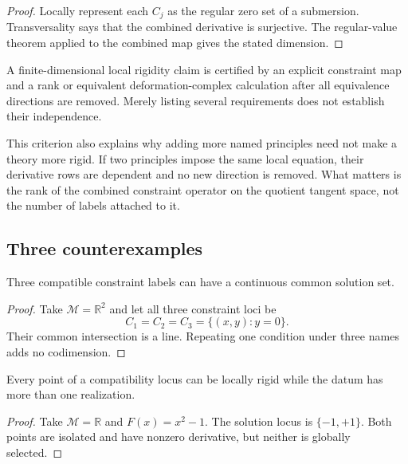\documentclass[11pt]{article}
\newcommand{\Mod}{\mathcal M}
\begin{document}
\begin{proof}
Locally represent each $C_j$ as the regular zero set of a submersion.
Transversality says that the combined derivative is surjective.  The
regular-value theorem applied to the combined map gives the stated dimension.
\end{proof}

\begin{corollary}
A finite-dimensional local rigidity claim is certified by an explicit
constraint map and a rank or equivalent deformation-complex calculation after
all equivalence directions are removed.  Merely listing several requirements
does not establish their independence.
\end{corollary}

This criterion also explains why adding more named principles need not make a
theory more rigid.  If two principles impose the same local equation, their
derivative rows are dependent and no new direction is removed.  What matters
is the rank of the combined constraint operator on the quotient tangent
space, not the number of labels attached to it.

\subsection{Three counterexamples}

\begin{proposition}
\label{prop:continuum}
Three compatible constraint labels can have a continuous common solution set.
\end{proposition}

\begin{proof}
Take $\Mod=\mathbb R^2$ and let all three constraint loci be
\[
 C_1=C_2=C_3=\{(x,y):y=0\}.
\]
Their common intersection is a line.  Repeating one condition under three
names adds no codimension.
\end{proof}

\begin{proposition}
\label{prop:two-points}
Every point of a compatibility locus can be locally rigid while the datum has
more than one realization.
\end{proposition}

\begin{proof}
Take $\Mod=\mathbb R$ and $F(x)=x^2-1$.  The solution locus is
$\{-1,+1\}$.  Both points are isolated and have nonzero derivative, but neither
is globally selected.
\end{proof}
\end{document}
